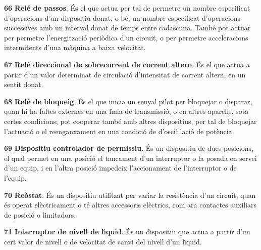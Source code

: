 \begin{multicols}{2}
\begin{list}{}
\item[\textbf{66}]   
\textbf{Rel\'{e} de passos}. \'{E}s el que actua per tal
de permetre un nombre especificat d'operacions d'un dispositiu
donat, o b\'{e}, un nombre especificat d'operacions successives amb un
interval donat de temps entre cadascuna. Tamb\'{e} pot actuar per
permetre l'energitzaci\'{o} peri\`{o}dica d'un circuit, o per permetre acceleracions intermitents d'una
m\`{a}quina a baixa velocitat.

\item[\textbf{67}]  
\textbf{Rel\'{e} direccional de sobrecorrent de corrent altern}. \'{E}s
el que actua a partir d'un valor determinat de circulaci\'{o}
d'intensitat de corrent altern, en un sentit donat.

\item[\textbf{68}]   
\textbf{Rel\'{e} de bloqueig}. \'{E}s el que inicia un
senyal pilot per bloquejar o disparar, quan hi ha faltes externes en
una l\'{\i}nia de transmissi\'{o}, o en altres aparells, sota certes
condicions; pot cooperar tamb\'{e} amb altres dispositius, per tal de
bloquejar l'actuaci\'{o} o el reenganxament en una condici\'{o}
de d'osci{\l.l}aci\'{o} de pot\`{e}ncia.

\item[\textbf{69}]   
\textbf{Dispositiu controlador de permissiu}. \'{E}s
un dispositiu  de dues posicions, el qual permet en una posici\'{o} el tancament d'un
interruptor o la posada en servei d'un equip, i en l'altra posici\'{o}
impedeix l'accionament de l'interruptor o de l'equip.

\item[\textbf{70}]   
\textbf{Re\`{o}stat}. \'{E}s un dispositiu utilitzat per
variar la resist\`{e}ncia d'un circuit, quan \'{e}s operat el\`{e}ctricament o t\'{e} altres accessoris el\`{e}ctrics, com ara contactes auxiliars de posici\'{o} o limitadors.

\item[\textbf{71}]   
\textbf{Interruptor de nivell de l\'{\i}quid}. \'{E}s un dispositiu que actua a partir d'un cert valor de nivell o de velocitat de canvi del nivell d'un l\'{\i}quid.


\end{list}
\end{multicols}
